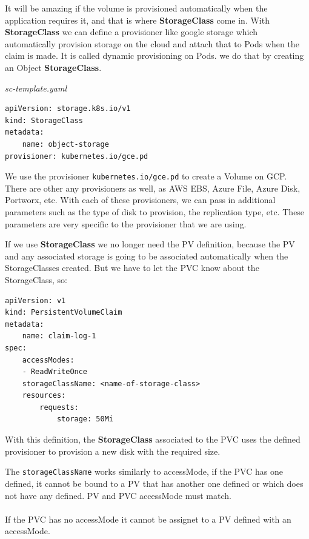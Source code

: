 \documentclass{article}
\newenvironment{blocktemplateIII}[1]{%
    \tcolorbox[beamer,%
    noparskip,breakable,
    ,colframe=Red,%
    colbacklower=LimeGreen!75!LightGreen,%
    title=#1]}%
    {\endtcolorbox}
\newenvironment{codetemplate}[1][]{%
  \mybasecolorbox[#1]
  \itshape
}{%
  \endmybasecolorbox
}
\begin{document}
It will be amazing if the volume is provisioned automatically when the application requires it, and that is where \textbf{StorageClass} come in. With \textbf{StorageClass} we can define a provisioner like google storage which automatically provision storage on the cloud and attach that to Pods when the claim is made. It is called dynamic provisioning on Pods. we do that by creating an Object \textbf{StorageClass}.

\begin{codetemplate}{sc-template.yaml}
\begin{verbatim}
apiVersion: storage.k8s.io/v1
kind: StorageClass
metadata:
    name: object-storage
provisioner: kubernetes.io/gce.pd
\end{verbatim}
\end{codetemplate}

We use the provisioner \verb|kubernetes.io/gce.pd| to create a Volume on GCP. There are other any provisioners as well, as AWS EBS, Azure File, Azure Disk, Portworx, etc. With each of these provisioners, we can pass in additional parameters such as the type of disk to provision, the replication type, etc. These parameters are very specific to the provisioner that we are using.

If we use \textbf{StorageClass} we no longer need the PV definition, because the PV and any associated storage is going to be associated automatically when the StorageClasses created. But we have to let the PVC know about the StorageClass, so:

\begin{codetemplate}{}
\begin{verbatim}
apiVersion: v1
kind: PersistentVolumeClaim
metadata:
    name: claim-log-1
spec:
    accessModes:
    - ReadWriteOnce
    storageClassName: <name-of-storage-class>
    resources:
        requests:
            storage: 50Mi
\end{verbatim}
\end{codetemplate}

With this definition, the \textbf{StorageClass} associated to the PVC uses the defined provisioner to provision a new disk with the required size.

\begin{blocktemplateIII}{WARNING}
The \verb|storageClassName| works similarly to accessMode, if the PVC has one defined, it cannot be bound to a PV that has another one defined or which does not have any defined. PV and PVC accessMode must match. 
\\\\
If the PVC has no accessMode it cannot be assignet to a PV defined with an accessMode.
\end{blocktemplateIII}
\end{document}
